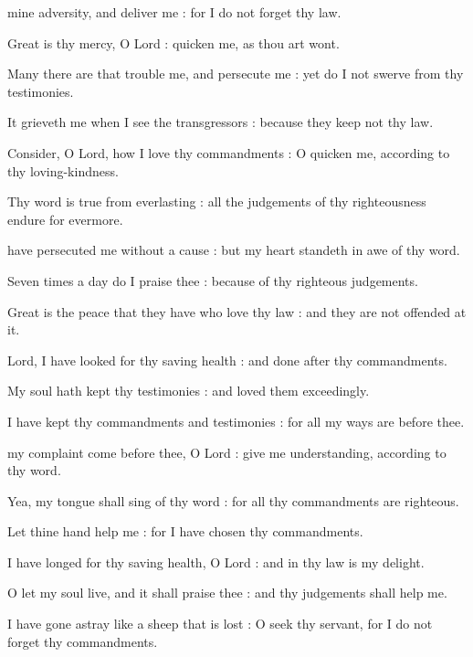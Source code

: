  mine adversity, and deliver me : for I do not forget thy law.\par
{}
Great is thy mercy, O Lord : quicken me, as thou art wont.\par
{}Many there are that trouble me, and persecute me : yet do I not swerve from thy testimonies.\par
{}It grieveth me when I see the transgressors : because they keep not thy law.\par
{}Consider, O Lord, how I love thy commandments : O quicken me, according to thy loving-kindness.\par
{}Thy word is true from everlasting : all the judgements of thy righteousness endure for evermore.\par

 have persecuted me without a cause : but my heart standeth in awe of thy word.\par
{}
Seven times a day do I praise thee : because of thy righteous judgements.\par
{}Great is the peace that they have who love thy law : and they are not offended at it.\par
{}Lord, I have looked for thy saving health : and done after thy commandments.\par
{}My soul hath kept thy testimonies : and loved them exceedingly.\par
{}I have kept thy commandments and testimonies : for all my ways are before thee.\par

 my complaint come before thee, O Lord : give me understanding, according to thy word.\par
{}
Yea, my tongue shall sing of thy word : for all thy commandments are righteous.\par
{}Let thine hand help me : for I have chosen thy commandments.\par
{}I have longed for thy saving health, O Lord : and in thy law is my delight.\par
{}O let my soul live, and it shall praise thee : and thy judgements shall help me.\par
{}I have gone astray like a sheep that is lost : O seek thy servant, for I do not forget thy commandments.\par

